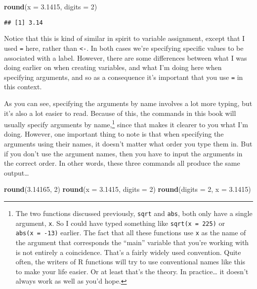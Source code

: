 \documentclass[]{book}
\newenvironment{Shaded}{\begin{snugshade}}{\end{snugshade}}
\newcommand{\DataTypeTok}[1]{\textcolor[rgb]{0.13,0.29,0.53}{#1}}
\newcommand{\DecValTok}[1]{\textcolor[rgb]{0.00,0.00,0.81}{#1}}
\newcommand{\FloatTok}[1]{\textcolor[rgb]{0.00,0.00,0.81}{#1}}
\newcommand{\KeywordTok}[1]{\textcolor[rgb]{0.13,0.29,0.53}{\textbf{#1}}}
\newcommand{\NormalTok}[1]{#1}
\let\rmarkdownfootnote\footnote%
\def\footnote{\protect\rmarkdownfootnote}
\begin{document}
\begin{Shaded}
\begin{Highlighting}[]
\KeywordTok{round}\NormalTok{(}\DataTypeTok{x =} \FloatTok{3.1415}\NormalTok{, }\DataTypeTok{digits =} \DecValTok{2}\NormalTok{)}
\end{Highlighting}
\end{Shaded}

\begin{verbatim}
## [1] 3.14
\end{verbatim}

Notice that this is kind of similar in spirit to variable assignment, except that I used \texttt{=} here, rather than \texttt{\textless{}-}. In both cases we're specifying specific values to be associated with a label. However, there are some differences between what I was doing earlier on when creating variables, and what I'm doing here when specifying arguments, and so as a consequence it's important that you use \texttt{=} in this context.

As you can see, specifying the arguments by name involves a lot more typing, but it's also a lot easier to read. Because of this, the commands in this book will usually specify arguments by name,\footnote{The two functions discussed previously, \texttt{sqrt} and \texttt{abs}, both only have a single argument, \texttt{x}. So I could have typed something like \texttt{sqrt(x\ =\ 225)} or \texttt{abs(x\ =\ -13)} earlier. The fact that all these functions use \texttt{x} as the name of the argument that corresponds the ``main'' variable that you're working with is not entirely a coincidence. That's a fairly widely used convention. Quite often, the writers of R functions will try to use conventional names like this to make your life easier. Or at least that's the theory. In practice\ldots{} it doesn't always work as well as you'd hope.} since that makes it clearer to you what I'm doing. However, one important thing to note is that when specifying the arguments using their names, it doesn't matter what order you type them in. But if you don't use the argument names, then you have to input the arguments in the correct order. In other words, these three commands all produce the same output\ldots{}

\begin{Shaded}
\begin{Highlighting}[]
\KeywordTok{round}\NormalTok{(}\FloatTok{3.14165}\NormalTok{, }\DecValTok{2}\NormalTok{)}
\KeywordTok{round}\NormalTok{(}\DataTypeTok{x =} \FloatTok{3.1415}\NormalTok{, }\DataTypeTok{digits =} \DecValTok{2}\NormalTok{)}
\KeywordTok{round}\NormalTok{(}\DataTypeTok{digits =} \DecValTok{2}\NormalTok{, }\DataTypeTok{x =} \FloatTok{3.1415}\NormalTok{)}
\end{Highlighting}
\end{Shaded}
\end{document}
